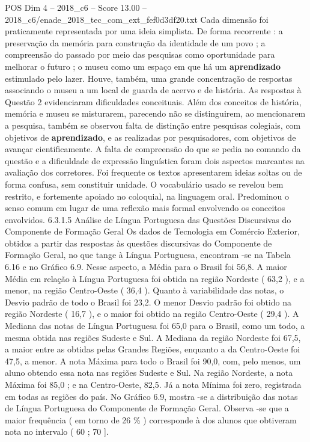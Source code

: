 \begin{textsample}{POS Dim 4 – 2018\_c6 – Score 13.00 – 2018\_c6/enade\_2018\_tec\_com\_ext\_fef0d3df20.txt}
Cada dimensão foi praticamente representada por uma ideia simplista.
De forma recorrente : a preservação da memória para construção da identidade de um povo ; a compreensão do passado por meio das pesquisas como oportunidade para melhorar o futuro ; o museu como um espaço em que há um \textbf{aprendizado} estimulado pelo lazer.
Houve, também, uma grande concentração de respostas associando o museu a um local de guarda de acervo e de história.
As respostas à Questão 2 evidenciaram dificuldades conceituais.
Além dos conceitos de história, memória e museu se misturarem, parecendo não se distinguirem, ao mencionarem a pesquisa, também se observou falta de distinção entre pesquisas colegiais, com objetivos de \textbf{aprendizado}, e as realizadas por pesquisadores, com objetivos de avançar cientificamente.
A falta de compreensão do que se pedia no comando da questão e a dificuldade de expressão linguística foram dois aspectos marcantes na avaliação dos corretores.
Foi frequente os textos apresentarem ideias soltas ou de forma confusa, sem constituir unidade.
O vocabulário usado se revelou bem restrito, e fortemente apoiado no coloquial, na linguagem oral.
Predominou o senso comum em lugar de uma reflexão mais formal envolvendo os conceitos envolvidos. 6.3.1.5 Análise de Língua Portuguesa das Questões Discursivas do Componente de Formação Geral Os dados de Tecnologia em Comércio Exterior, obtidos a partir das respostas às questões discursivas do Componente de Formação Geral, no que tange à Língua Portuguesa, encontram -se na Tabela 6.16 e no Gráfico 6.9.
Nesse aspecto, a Média para o Brasil foi 56,8.
A maior Média em relação à Língua Portuguesa foi obtida na região Nordeste ( 63,2 ), e a menor, na região Centro-Oeste ( 36,4 ).
Quanto à variabilidade das notas, o Desvio padrão de todo o Brasil foi 23,2.
O menor Desvio padrão foi obtido na região Nordeste ( 16,7 ), e o maior foi obtido na região Centro-Oeste ( 29,4 ).
A Mediana das notas de Língua Portuguesa foi 65,0 para o Brasil, como um todo, a mesma obtida nas regiões Sudeste e Sul.
A Mediana da região Nordeste foi 67,5, a maior entre as obtidas pelas Grandes Regiões, enquanto a da Centro-Oeste foi 47,5, a menor.
A nota Máxima para todo o Brasil foi 90,0, com, pelo menos, um aluno obtendo essa nota nas regiões Sudeste e Sul.
Na região Nordeste, a nota Máxima foi 85,0 ; e na Centro-Oeste, 82,5.
Já a nota Mínima foi zero, registrada em todas as regiões do país.
No Gráfico 6.9, mostra -se a distribuição das notas de Língua Portuguesa do Componente de Formação Geral.
Observa -se que a maior frequência ( em torno de 26 \% ) corresponde à dos alunos que obtiveram nota no intervalo ( 60 ; 70 ].

\end{textsample}
